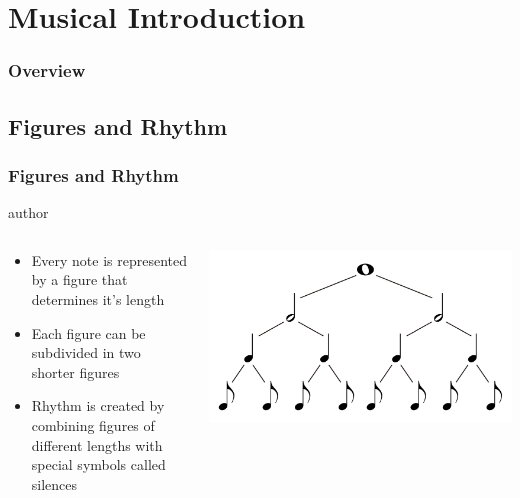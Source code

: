 \documentclass[english]{beamer}
\begin{document}
\section{Musical Introduction}
\begin{frame}
	\frametitle{Overview}
\end{frame}
\subsection{Figures and Rhythm}
	\begin{frame}
		\frametitle{Figures and Rhythm}
		\begin{beamercolorbox}[leftskip=8cm,center,wd=0.7\textwidth]{author}
		\begin{columns}[T]
		\begin{column}{.60\textwidth}%
		\begin{itemize}
			\item Every note is represented by a \alert{figure} that determines it's \alert{length}
			\item Each figure can be \alert{subdivided in two} shorter figures
			\item \alert{Rhythm} is created by \alert{combining figures} of different lengths with special symbols called silences
		\end{itemize}
		\end{column}
		\begin{column}{.39\textwidth}%
		\includegraphics[width=\linewidth]{imagenes/music_tree.pdf}
		\end{column}
		\end{columns}
		\end{beamercolorbox}
		
	\end{frame}
\end{document}
